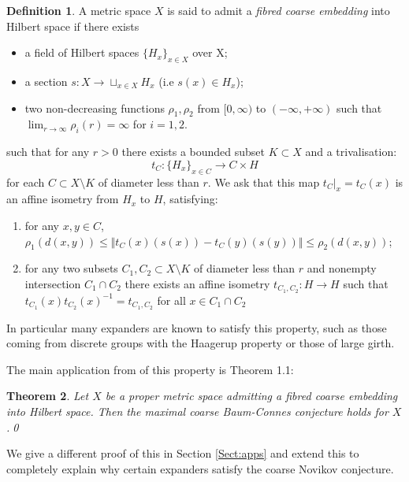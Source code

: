 \documentclass[11pt]{amsart}
\theoremstyle{plain}
\newtheorem{theorem}{Theorem}%
\theoremstyle{definition}%
\newtheorem{definition}[theorem]{Definition}%
\theoremstyle{remark}%
\begin{document}
\begin{definition}
A metric space $X$ is said to admit a \textit{fibred coarse embedding} into Hilbert space if there exists
\begin{itemize}
\item a field of Hilbert spaces $\lbrace H_{x} \rbrace_{x \in X}$ over X;
\item a section $s: X \rightarrow \sqcup_{x \in X}H_{x}$ (i.e $s(x) \in H_{x}$);
\item two non-decreasing functions $\rho_{1}, \rho_{2}$ from $[0,\infty)$ to $(-\infty, +\infty)$ such that $\lim_{r\rightarrow \infty}\rho_{i}(r)=\infty$ for $i=1,2$.
\end{itemize}
such that for any $r>0$ there exists a bounded subset $K\subset X$ and a trivalisation:
\begin{equation*}
t_{C}: \lbrace H_{x} \rbrace_{x \in C} \rightarrow C\times H
\end{equation*}
for each $C \subset X \setminus K$ of diameter less than $r$. We ask that this map $t_{C}|_{x}=t_{C}(x)$ is an affine isometry from  $H_{x}$ to $H$, satisfying:
\begin{enumerate}
\item for any $x,y \in C$, $\rho_{1}(d(x,y))\leq \Vert t_{C}(x)(s(x)) - t_{C}(y)(s(y)) \Vert \leq \rho_{2}(d(x,y))$;
\item for any two subsets $C_{1},C_{2} \subset X\setminus K$ of diameter less than $r$ and nonempty intersection $C_{1}\cap C_{2}$ there exists an affine isometry $t_{C_{1},C_{2}}:H \rightarrow H$ such that $t_{C_{1}}(x)t_{C_{2}}(x)^{-1}=t_{C_{1},C_{2}}$ for all $x \in C_{1}\cap C_{2}$
\end{enumerate}
\end{definition}

In particular many expanders are known to satisfy this property, such as those coming from discrete groups with the Haagerup property \cite{FCEpaper,MR2568691} or those of large girth.

The main application from \cite{FCEpaper} of this property is Theorem 1.1:

\begin{theorem}\label{Thm:FCEMR}
Let $X$ be a proper metric space admitting a fibred coarse embedding into Hilbert space. Then the maximal coarse Baum-Connes conjecture holds for $X$.\qed
\end{theorem}

We give a different proof of this in Section \ref{Sect:apps} and extend this to completely explain why certain expanders satisfy the coarse Novikov conjecture.
\end{document}
